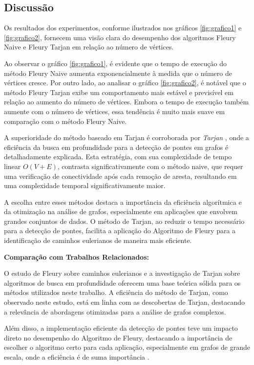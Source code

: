 \documentclass[12pt]{article}
\begin{document}
\subsection{Discussão}

Os resultados dos experimentos, conforme ilustrados nos gráficos \ref{fig:grafico1} e \ref{fig:grafico2}, fornecem uma visão clara do desempenho dos algoritmos Fleury Naive e Fleury Tarjan em relação ao número de vértices.

Ao observar o gráfico \ref{fig:grafico1}, é evidente que o tempo de execução do método Fleury Naive aumenta exponencialmente à medida que o número de vértices cresce. Por outro lado, ao analisar o gráfico \ref{fig:grafico2}, é notável que o método Fleury Tarjan exibe um comportamento mais estável e previsível em relação ao aumento do número de vértices. Embora o tempo de execução também aumente com o número de vértices, essa tendência é muito mais suave em comparação com o método Fleury Naive.

A superioridade do método baseado em Tarjan é corroborada por \textit{Tarjan} \cite{tarjan1972depth}, onde a eficiência da busca em profundidade para a detecção de pontes em grafos é detalhadamente explicada. Esta estratégia, com sua complexidade de tempo linear $O(V+E)$, contrasta significativamente com o método naive, que requer uma verificação de conectividade após cada remoção de aresta, resultando em uma complexidade temporal significativamente maior.

A escolha entre esses métodos destaca a importância da eficiência algorítmica e da otimização na análise de grafos, especialmente em aplicações que envolvem grandes conjuntos de dados. O método de Tarjan, ao reduzir o tempo necessário para a detecção de pontes, facilita a aplicação do Algoritmo de Fleury para a identificação de caminhos eulerianos de maneira mais eficiente.

\textbf{Comparação com Trabalhos Relacionados:}

O estudo de Fleury sobre caminhos eulerianos \cite{fleury1883deux} e a investigação de Tarjan \cite{tarjan1972depth} sobre algoritmos de busca em profundidade oferecem uma base teórica sólida para os métodos utilizados neste trabalho. A eficiência do método de Tarjan, como observado neste estudo, está em linha com as descobertas de Tarjan, destacando a relevância de abordagens otimizadas para a análise de grafos complexos.

Além disso, a implementação eficiente da detecção de pontes teve um impacto direto no desempenho do Algoritmo de Fleury, destacando a importância de escolher o algoritmo certo para cada aplicação, especialmente em grafos de grande escala, onde a eficiência é de suma importância \cite{tarjan1972depth}.
\end{document}
